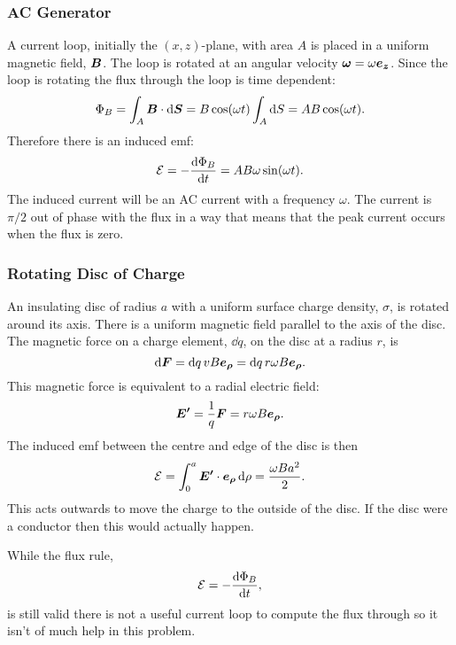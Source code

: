     \subsubsection{AC Generator}
    A current loop, initially the \((x, z)\)-plane, with area \(A\) is placed in a uniform magnetic field, \(\bm{B}\).
    The loop is rotated at an angular velocity \(\bm{\omega} = \omega\bm{e_{z}}\).
    Since the loop is rotating the flux through the loop is time dependent:
    \[\Phi_B = \int_A\bm{B}\cdot\dd{\bm{S}} = B\cos(\omega t)\int_A\dd{S} = AB\cos(\omega t).\]
    Therefore there is an induced \gls{emf}:
    \[\mathcal{E} = -\dv{\Phi_B}{t} = AB\omega\sin(\omega t).\]
    The induced current will be an AC current with a frequency \(\omega\).
    The current is \(\pi/2\) out of phase with the flux in a way that means that the peak current occurs when the flux is zero.
    
    \subsubsection{Rotating Disc of Charge}
    An insulating disc of radius \(a\) with a uniform surface charge density, \(\sigma\), is rotated around its axis.
    There is a uniform magnetic field parallel to the axis of the disc.
    The magnetic force on a charge element, \(\dd{q}\), on the disc at a radius \(r\), is
    \[\dd{\bm{F}} = \dd{q}vB\bm{e_{\rho}} = \dd{q}r\omega B\bm{e_{\rho}}.\]
    This magnetic force is equivalent to a radial electric field:
    \[\bm{E'} = \frac{1}{q}\bm{F} = r\omega B\bm{e_{\rho}}.\]
    The induced \gls{emf} between the centre and edge of the disc is then
    \[\mathcal{E} = \int_{0}^a\bm{E'}\cdot\bm{e_{\rho}}\dd{\rho} = \frac{\omega Ba^2}{2}.\]
    This acts outwards to move the charge to the outside of the disc.
    If the disc were a conductor then this would actually happen.
    
    While the flux rule,
    \[\mathcal{E} = -\dv{\Phi_B}{t},\]
    is still valid there is not a useful current loop to compute the flux through so it isn't of much help in this problem.
    

